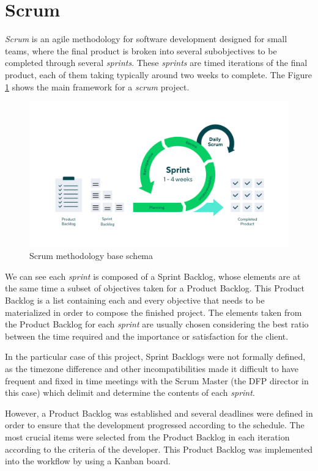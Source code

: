 \section{Scrum}

\textit{Scrum} \cite{noauthor_scrum_2022} is an agile methodology for software development designed for small teams, where the final product is broken into several subobjectives to be completed through several \textit{sprints}. These \textit{sprints} are timed iterations of the final product, each of them taking typically around two weeks to complete. The Figure \ref{fig:scrum} shows the main framework for a \textit{scrum} project. 

\begin{figure}[h]
  \centering
  \includegraphics[width=\textwidth]{Figures/scrum.png}
  \caption{%
    Scrum methodology base schema
  }
  \label{fig:scrum}
\end{figure}

We can see each \textit{sprint} is composed of a Sprint Backlog, whose elements are at the same time a subset of objectives taken for a Product Backlog. This Product Backlog is a list containing each and every objective that needs to be materialized in order to compose the finished project. The elements taken from the Product Backlog for each \textit{sprint} are usually chosen considering the best ratio between the time required and the importance or satisfaction for the client.

In the particular case of this project, Sprint Backlogs were not formally defined, as the timezone difference and other incompatibilities made it difficult to have frequent and fixed in time meetings with the Scrum Master (the DFP director in this case) which delimit and determine the contents of each \textit{sprint}.

However, a Product Backlog was established and several deadlines were defined in order to ensure that the development progressed according to the schedule. The most crucial items were selected from the Product Backlog in each iteration according to the criteria of the developer. This Product Backlog was implemented into the workflow by using a Kanban board.


